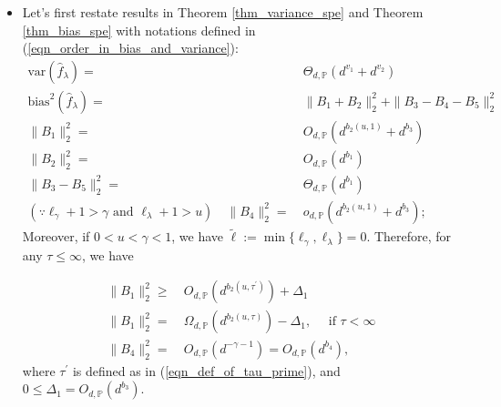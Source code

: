\documentclass{article}
\theoremstyle{plain}
\theoremstyle{definition}
\theoremstyle{remark}
\begin{document}
\begin{appendix}
\begin{itemize}
    \item Let's first restate results in Theorem \ref{thm_variance_spe} and Theorem \ref{thm_bias_spe} with notations defined in (\ref{eqn_order_in_bias_and_variance}):
\begin{equation}\label{eqn_learning_curve_pre_results_1}
    \begin{aligned}
        \mathrm{var}(\hat{f}_{\lambda}) = &~ \Theta_{d, \mathbb{P}}\left( d^{v_1} + d^{v_2} \right)\\
        \mathrm{bias}^{2}(\hat{f}_{\lambda})  =  &~
    \|B_1+B_2\|_{2}^{2} + \|B_3-B_4-B_5\|_{2}^{2}\\
    \|B_1\|_{2}^{2}  =&~ 
                O_{d, \mathbb{P}}\left(d^{b_2(u, 1)}+d^{b_3}\right)\\
                \|B_2\|_{2}^{2} =&~ 
            O_{d, \mathbb{P}}\left(  d^{b_1}\right)\\
            \|B_3-B_5\|_{2}^{2} 
        =&~
        \Theta_{d, \mathbb{P}} \left( d^{b_1}\right)\\
        (\because \ell_{\gamma} + 1 > \gamma \text{ and } \ell_{\lambda}+1 > u) \quad \|B_4\|_{2}^{2} =&~ o_{d, \mathbb{P}} \left(d^{b_2(u, 1)}+d^{b_3}\right);
    \end{aligned}
\end{equation}
Moreover, if $0 < u < \gamma <1$, we have $\tilde{\ell}:=\min\{\ell_{\gamma}, \ell_{\lambda}\}=0$. 
Therefore, for any $\tau \leq \infty$, we have

\begin{equation}\label{eqn_learning_curve_pre_results_2}
    \begin{aligned}
    \|B_1\|_{2}^{2}  \geq&~ 
                O_{d, \mathbb{P}}\left( d^{b_2(u, \tau^{\prime})}  \right) + \Delta_1\\
                \|B_1\|_{2}^{2}  =&~ 
                \Omega_{d, \mathbb{P}}\left( d^{b_2(u, \tau)} \right)- \Delta_1, \quad \text{ if } \tau<\infty\\
    \|B_4\|_{2}^{2} =&~ O_{d, \mathbb{P}} \left(d^{-\gamma-1}\right) = O_{d, \mathbb{P}} \left(d^{b_4}\right),           
    \end{aligned}
\end{equation}
where $\tau^{\prime}$ is defined as in (\ref{eqn_def_of_tau_prime}), and $0 \leq \Delta_1 = O_{d, \mathbb{P}}\left( d^{b_3}\right)$.



\end{itemize}
\end{appendix}
\end{document}
